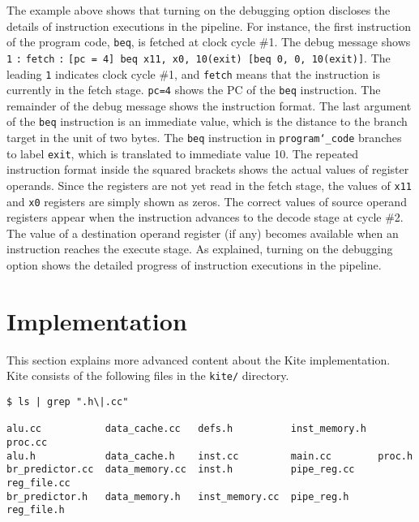 \documentclass[10pt]{article}
\begin{document}
The example above shows that turning on the debugging option discloses the details of instruction executions in the pipeline.
For instance, the first instruction of the program code, {\tt\small beq}, is fetched at clock cycle \#1.
The debug message shows {\tt\small 1} {\tt\small :} {\tt\small fetch} {\tt\small :} {\tt\small[pc = 4] beq x11, x0, 10(exit) [beq 0, 0, 10(exit)]}.
The leading {\tt\small 1} indicates clock cycle \#1, and {\tt\small fetch} means that the instruction is currently in the fetch stage.
{\tt\small pc=4} shows the PC of the {\tt\small beq} instruction.
The remainder of the debug message shows the instruction format.
The last argument of the {\tt\small beq} instruction is an immediate value, which is the distance to the branch target in the unit of two bytes.
The {\tt\small beq} instruction in {\tt\small program\char`_code} branches to label {\tt\small exit}, which is translated to immediate value 10.
The repeated instruction format inside the squared brackets shows the actual values of register operands.
Since the registers are not yet read in the fetch stage, the values of {\tt\small x11} and {\tt\small x0} registers are simply shown as zeros.
The correct values of source operand registers appear when the instruction advances to the decode stage at cycle \#2.
The value of a destination operand register (if any) becomes available when an instruction reaches the execute stage.
As explained, turning on the debugging option shows the detailed progress of instruction executions in the pipeline.


\section{Implementation} \label{sec:implementation}
This section explains more advanced content about the Kite implementation.
Kite consists of the following files in the {\tt\small kite/} directory.

\begin{Verbatim}[frame=single,fontsize=\small]
$ ls | grep ".h\|.cc"

alu.cc           data_cache.cc   defs.h          inst_memory.h  proc.cc
alu.h            data_cache.h    inst.cc         main.cc        proc.h
br_predictor.cc  data_memory.cc  inst.h          pipe_reg.cc    reg_file.cc
br_predictor.h   data_memory.h   inst_memory.cc  pipe_reg.h     reg_file.h
\end{Verbatim}
\end{document}
